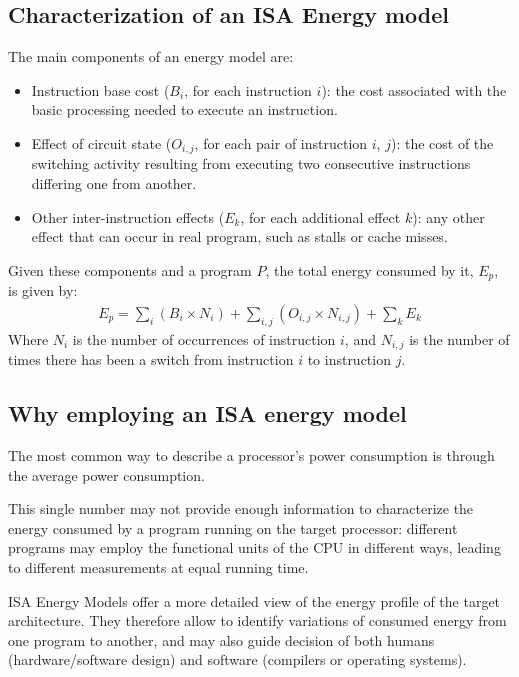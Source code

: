 \subsection{Characterization of an ISA Energy model}
The main components of an energy model are:
\begin{itemize}
\item Instruction base cost ($B_{i}$, for each instruction $i$): the cost associated with the basic processing needed to execute an instruction. 
\item Effect of circuit state ($O_{i,j}$, for each pair of instruction $i$, $j$): the cost of the switching activity resulting from executing two consecutive instructions differing one from another.
\item Other inter-instruction effects ($E_{k}$, for each additional effect $k$): any other effect that can occur in real program, such as stalls or cache misses.
\end{itemize}
\par Given these components and a program $P$, the total energy consumed by it, $E_{p}$, is given by:
\begin{gather*}
E_{p} = \sum_{i} (B_{i} \times N_{i}) + \sum_{i,j} (O_{i,j} \times N_{i,j}) + \sum_{k} E_{k}
\end{gather*}
Where $N_{i}$ is the number of occurrences of instruction $i$, and $N_{i,j}$ is the number of times there has been a switch from instruction $i$ to instruction $j$.

\subsection{Why employing an ISA energy model}
The most common way to describe a processor's power consumption is through the average power consumption. \par
This single number may not provide enough information to characterize the energy consumed by a program running on the target processor: different programs may employ the functional units of the CPU in different ways, leading to different measurements at equal running time. \par
ISA Energy Models offer a more detailed view of the energy profile of the target architecture. They therefore allow to identify variations of consumed energy from one program to another, and may also guide decision of both humans (hardware/software design) and software (compilers or operating systems).

